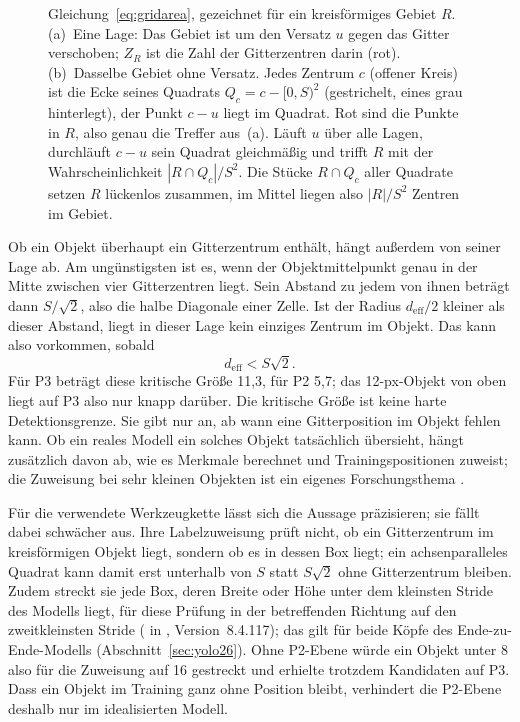 \begin{figure}[htbp]
{Gleichung~\eqref{eq:gridarea}, gezeichnet für ein kreisförmiges Gebiet $R$.
(a)~Eine Lage: Das Gebiet ist um den Versatz $u$ gegen das Gitter verschoben;
$Z_R$ ist die Zahl der Gitterzentren darin (rot). (b)~Dasselbe Gebiet ohne
Versatz. Jedes Zentrum $c$ (offener Kreis) ist die Ecke seines Quadrats
$Q_c = c-[0,S)^2$ (gestrichelt, eines grau hinterlegt), der Punkt $c-u$ liegt
im Quadrat. Rot sind die Punkte in $R$, also genau die Treffer aus~(a). Läuft
$u$ über alle Lagen, durchläuft $c-u$ sein Quadrat gleichmäßig und trifft $R$
mit der Wahrscheinlichkeit $|R\cap Q_c|/S^2$. Die Stücke $R\cap Q_c$ aller
Quadrate setzen $R$ lückenlos zusammen, im Mittel liegen also $|R|/S^2$
Zentren im Gebiet.}
\label{abb:gitterflaeche}
\end{figure}

Ob ein Objekt überhaupt ein Gitterzentrum enthält, hängt außerdem von seiner
Lage ab. Am ungünstigsten ist es, wenn der Objektmittelpunkt genau in der Mitte
zwischen vier Gitterzentren liegt. Sein Abstand zu jedem von ihnen beträgt dann
$S/\sqrt{2}$, also die halbe Diagonale einer Zelle. Ist der Radius
$d_{\mathrm{eff}}/2$ kleiner als dieser Abstand, liegt in dieser Lage kein
einziges Zentrum im Objekt. Das kann also vorkommen, sobald
\begin{equation}
  d_{\mathrm{eff}} < S\sqrt{2}.
  \label{eq:gridmiss}
\end{equation}
Für P3 beträgt diese kritische Größe 11,3\px, für P2 5,7\px; das 12-px-Objekt
von oben liegt auf P3 also nur knapp darüber. Die kritische Größe ist keine
harte Detektionsgrenze. Sie gibt nur an, ab wann eine Gitterposition im Objekt
fehlen kann. Ob ein reales Modell ein solches Objekt tatsächlich übersieht,
hängt zusätzlich davon ab, wie es Merkmale berechnet und Trainingspositionen
zuweist; die Zuweisung bei sehr kleinen Objekten ist ein eigenes
Forschungsthema \parencite{zhang2020atss,xu2022rfla}.

Für die verwendete Werkzeugkette lässt sich die Aussage präzisieren; sie fällt
dabei schwächer aus. Ihre Labelzuweisung prüft nicht, ob ein Gitterzentrum im
kreisförmigen Objekt liegt, sondern ob es in dessen Box liegt; ein
achsenparalleles Quadrat kann damit erst unterhalb von $S$ statt $S\sqrt{2}$
ohne Gitterzentrum bleiben. Zudem streckt sie jede Box, deren Breite oder Höhe
unter dem kleinsten Stride des Modells liegt, für diese Prüfung in der
betreffenden Richtung auf den zweitkleinsten Stride
( in ,
Version~8.4.117); das gilt für beide Köpfe des Ende-zu-Ende-Modells
(Abschnitt~\ref{sec:yolo26}). Ohne P2-Ebene würde ein Objekt unter 8\px{} also
für die Zuweisung auf 16\px{} gestreckt und erhielte trotzdem Kandidaten auf
P3. Dass ein Objekt im Training ganz ohne Position bleibt, verhindert die
P2-Ebene deshalb nur im idealisierten Modell.

